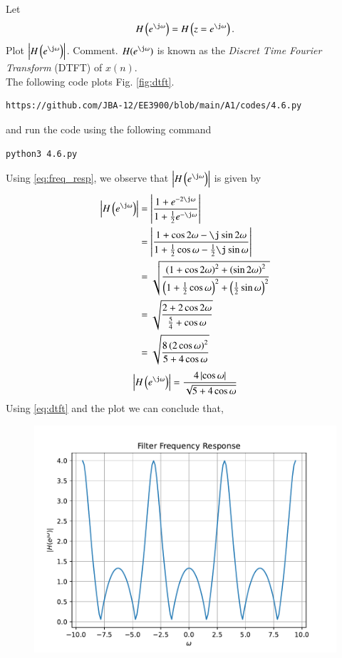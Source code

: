 \documentclass[journal,12pt,twocolumn]{IEEEtran}
\renewcommand\thesection{\arabic{section}}
\begin{document}
\begin{enumerate}[label=\thesection.\arabic*]
Let
\begin{equation}
H\brak{e^{\j \omega}} = H\brak{z = e^{\j \omega}}.
\end{equation}
Plot $\abs{H\brak{e^{\j \omega}}}$.  Comment.  $H(e^{\j \omega})$ is
known as the {\em Discret Time Fourier Transform} (DTFT) of $x(n)$.
\\
\solution The following code plots Fig. \ref{fig:dtft}.
\begin{lstlisting}
https://github.com/JBA-12/EE3900/blob/main/A1/codes/4.6.py
\end{lstlisting}
and run the code using the following command
\begin{lstlisting}
python3 4.6.py
\end{lstlisting}
Using \eqref{eq:freq_resp}, we observe that $\left|H\brak{e^{\j\omega}}\right|$ is given by
\begin{align}
\abs{H\brak{e^{\j \omega}}} &= \abs{\frac{1 + e^{-2\j\omega}}{1 + \frac{1}{2}e^{-\j\omega}}}\\ &= \abs{\frac{1+\cos{2\omega}-\j\sin{2\omega}}{1+\frac{1}{2}\cos{\omega}-\frac{1}{2}\j\sin{\omega}}}\\ &= \sqrt{\frac{\brak{1+\cos{2\omega}}^2+\brak{\sin{2\omega}}^2}{\brak{1+\frac{1}{2}\cos{\omega}}^2+\brak{\frac{1}{2}\sin{\omega}}^2}}\\ &= \sqrt{\frac{2+2\cos{2\omega}}{\frac{5}{4}+\cos{\omega}}}\\ &= \sqrt{\frac{8\brak{2\cos{\omega}}^2}{5+4\cos{\omega}}}
\end{align}
\begin{equation}
\label{eq:dtft}
\abs{H\brak{e^{\j \omega}}} = \frac{4\abs{\cos{\omega}}}{\sqrt{5+4\cos{\omega}}}
\end{equation}
Using \eqref{eq:dtft} and the plot we can conclude that,
\begin{figure}[!htbp]
\centering
\includegraphics[width=\columnwidth]{./figs/dtft}

\end{figure}
\end{enumerate}
\end{document}
